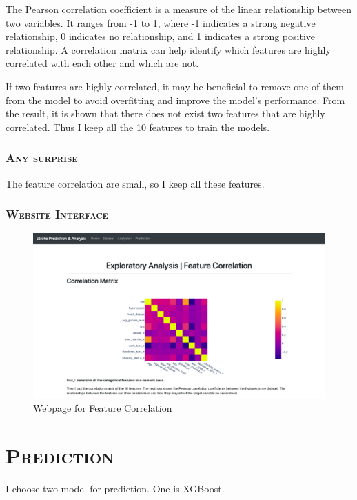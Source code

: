 \documentclass[a4paper,12pt]{article}
\begin{document}
The Pearson correlation coefficient is a measure of the linear relationship between two variables. It ranges from -1 to 1, where -1 indicates a strong negative relationship, 0 indicates no relationship, and 1 indicates a strong positive relationship. A correlation matrix can help identify which features are highly correlated with each other and which are not.

If two features are highly correlated, it may be beneficial to remove one of them from the model to avoid overfitting and improve the model's performance. From the result, it is shown that there does not exist two features that are highly correlated. Thus I keep all the 10 features to train the models.

\subsubsection{\textsc{Any surprise}}
The feature correlation are small, so I keep all these features.


\subsubsection{\textsc{Website Interface}}
\begin{figure}[h] 
    \centering
    \includegraphics[width=1\textwidth]{fc} 
    \caption{Webpage for Feature Correlation} 
\end{figure}



\section{\textsc{Prediction}}
I choose two model for prediction. One is XGBoost.
\end{document}
